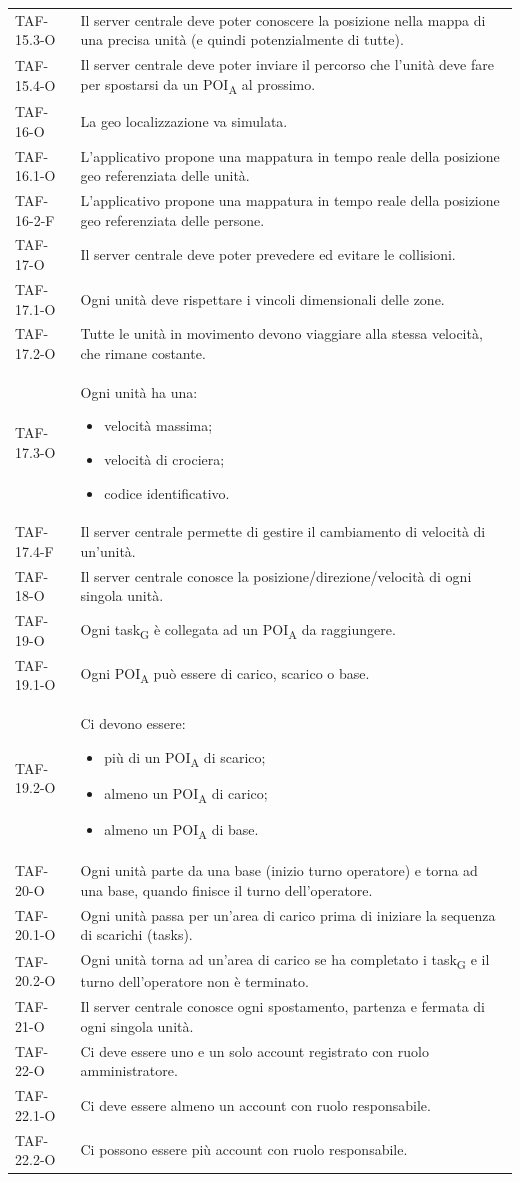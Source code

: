 \begin{longtable}{ >{\centering}p{} >{}p{}}
	TAF-15.3-O & Il server centrale deve poter conoscere la posizione nella mappa di una precisa unità (e quindi potenzialmente di tutte).\tabularnewline
	TAF-15.4-O & Il server centrale deve poter inviare il percorso che l'unità deve fare per spostarsi da un POI\textsubscript{A} al prossimo.\tabularnewline

	TAF-16-O & La geo localizzazione va simulata.\tabularnewline
	TAF-16.1-O & L'applicativo propone una mappatura in tempo reale della posizione geo referenziata delle unità.\tabularnewline
	TAF-16-2-F & L'applicativo propone una mappatura in tempo reale della posizione geo referenziata delle persone.\tabularnewline

	TAF-17-O & Il server centrale deve poter prevedere ed evitare le collisioni.\tabularnewline
	TAF-17.1-O & Ogni unità deve rispettare i vincoli dimensionali delle zone.\tabularnewline
	TAF-17.2-O & Tutte le unità in movimento devono viaggiare alla stessa velocità, che rimane costante.\tabularnewline
	TAF-17.3-O & Ogni unità ha una: \begin{itemize}
		\item velocità massima;
		\item velocità di crociera;
		\item codice identificativo.
	\end{itemize}
	\tabularnewline
	TAF-17.4-F & Il server centrale permette di gestire il cambiamento di velocità di un'unità.\tabularnewline

	TAF-18-O & Il server centrale conosce la posizione/direzione/velocità di ogni singola unità. \tabularnewline

	TAF-19-O & Ogni task\textsubscript{G} è collegata ad un POI\textsubscript{A} da raggiungere.\tabularnewline
	TAF-19.1-O & Ogni POI\textsubscript{A} può essere di carico, scarico o base.\tabularnewline
	TAF-19.2-O & Ci devono essere: \begin{itemize}
		\item più di un POI\textsubscript{A} di scarico;
		\item almeno un POI\textsubscript{A} di carico;
		\item almeno un POI\textsubscript{A} di base.
	\end{itemize}
 	\tabularnewline

	TAF-20-O & Ogni unità parte da una base (inizio turno operatore) e torna ad una base, quando finisce il turno dell'operatore.\tabularnewline
	TAF-20.1-O & Ogni unità passa per un'area di carico prima di iniziare la sequenza di scarichi (tasks).\tabularnewline
	TAF-20.2-O & Ogni unità torna ad un'area di carico se ha completato i task\textsubscript{G} e il turno dell'operatore non è terminato.\tabularnewline
	TAF-21-O & Il server centrale conosce ogni spostamento, partenza e fermata di ogni singola unità.\tabularnewline
	TAF-22-O & Ci deve essere uno e un solo account registrato con ruolo amministratore.\tabularnewline
	TAF-22.1-O & Ci deve essere almeno un account con ruolo responsabile.\tabularnewline
	TAF-22.2-O & Ci possono essere più account con ruolo responsabile.\tabularnewline



\end{longtable}
